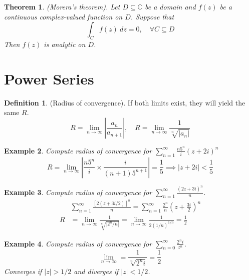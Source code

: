 \documentclass{article}
\newtheorem{theorem}{Theorem}[section]
\newtheorem{example}[theorem]{Example}
\theoremstyle{definition}
\newtheorem{definition}{Definition}[section]
\begin{document}
\begin{theorem}
    (Morera's theorem). Let $D \subseteq \mathbb{C}$ be a domain and $f(z)$ be a continuous complex-valued function on $D$. Suppose that
    \begin{equation*}
        \int_C f(z)\ dz = 0,\quad \forall C \subseteq D
    \end{equation*}
    Then $f(z)$ is analytic on $D$.
\end{theorem}


\section{Power Series}

\begin{definition}
    (Radius of convergence). If both limits exist, they will yield the same $R$.
    \begin{equation*}
        R = \lim_{n \to \infty} \left| \frac{a_n}{a_{n+1}} \right|, \quad R = \lim_{n \to \infty} \frac{1}{\sqrt[n]{|a_n|}}
    \end{equation*}
\end{definition}

\begin{example} \normalfont
    Compute radius of convergence for $\sum_{n=1}^\infty \frac{n5^n}{i} (z+2i)^n$
    \begin{equation*}
        R = \lim_{n \to \infty} \left| \frac{n 5^n}{i} \times \frac{i}{(n+1) 5^{n+1}} \right| = \frac{1}{5} \implies |z+2i| < \frac{1}{5}
    \end{equation*}
\end{example}

\begin{example} \normalfont
    Compute radius of convergence for $\sum_{n=1}^\infty \frac{(2z+3i)^n}{n}$.
    \begin{align*}
        &\sum_{n=1}^\infty \frac{[2(z+3i/2)]^n}{n} = \sum_{n=1}^\infty \frac{2^n}{n} \left( z + \frac{3i}{2} \right)^n \\
        R &= \lim_{n \to \infty} \frac{1}{\sqrt[n]{|2^n/n|}} = \lim_{n \to \infty} \frac{1}{2(1/n)^{1/n}} = \frac{1}{2}
    \end{align*}
\end{example}

\begin{example} \normalfont
    Compute radius of convergence for $\sum_{n=0}^\infty \frac{2^n i}{z^n}$.
    \begin{equation*}
        \lim_{n \to \infty} = \frac{1}{\sqrt[n]{2^n i}} = \frac{1}{2}
    \end{equation*}
    Converges if $|z| > 1/2$ and diverges if $|z| < 1/2$.
\end{example}
\end{document}
